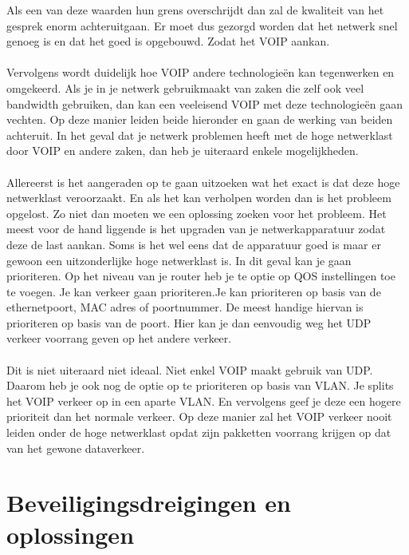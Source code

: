 \documentclass[pdftex,a4paper,12pt,twoside]{report}
\begin{document}
Als een van deze waarden hun grens overschrijdt dan zal de kwaliteit van het gesprek enorm achteruitgaan. Er moet dus gezorgd worden dat het netwerk snel genoeg is en dat het goed is opgebouwd. Zodat het VOIP aankan. \\ \\
Vervolgens wordt duidelijk hoe VOIP andere technologieën kan tegenwerken en omgekeerd. Als je in je netwerk gebruikmaakt van zaken die zelf ook veel bandwidth gebruiken, dan kan een veeleisend VOIP met deze technologieën gaan vechten. Op deze manier leiden beide hieronder en gaan de werking van beiden achteruit. In het geval dat je netwerk problemen heeft met de hoge netwerklast door VOIP en andere zaken, dan heb je uiteraard enkele mogelijkheden. 
\\ \\
\newpage
Allereerst is het aangeraden op te gaan uitzoeken wat het exact is dat deze hoge netwerklast veroorzaakt. En als het kan verholpen worden dan is het probleem opgelost. Zo niet dan moeten we een oplossing zoeken voor het probleem.  Het meest voor de hand liggende is het upgraden van je netwerkapparatuur zodat deze de last aankan. Soms is het wel eens dat de apparatuur goed is maar er gewoon een uitzonderlijke hoge netwerklast is. In dit geval kan je gaan prioriteren. Op het niveau van je router heb je te optie op QOS instellingen toe te voegen. Je kan verkeer gaan prioriteren.Je kan prioriteren op basis van de ethernetpoort, MAC adres of poortnummer. De meest handige hiervan is prioriteren op basis van de poort. Hier kan je dan eenvoudig weg het UDP verkeer voorrang geven op het andere verkeer.\\ \\
Dit is niet uiteraard niet ideaal. Niet enkel VOIP maakt gebruik van UDP. Daarom heb je ook nog de optie op te prioriteren op basis van VLAN. Je splits het VOIP verkeer op in een aparte VLAN. En vervolgens geef je deze een hogere prioriteit dan het normale verkeer. Op deze manier zal het VOIP verkeer nooit leiden onder de hoge netwerklast opdat zijn pakketten voorrang krijgen op dat van het gewone dataverkeer.




\chapter{Beveiligingsdreigingen en oplossingen}
\label{ch:Beveiligingsdreigingen}
\end{document}
